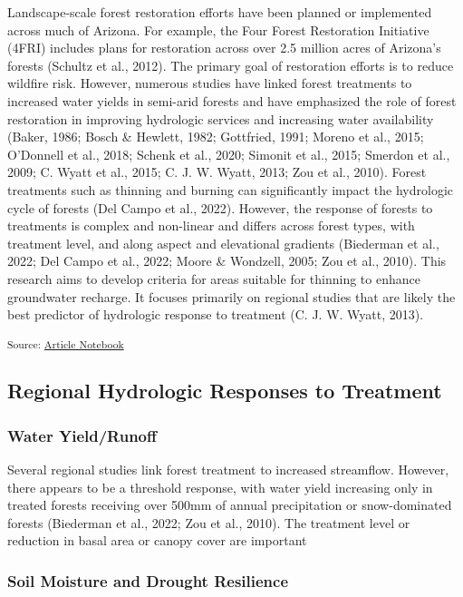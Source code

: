 \documentclass[
]{agujournal2019}
\begin{document}
Landscape-scale forest restoration efforts have been planned or
implemented across much of Arizona. For example, the Four Forest
Restoration Initiative (4FRI) includes plans for restoration across over
2.5 million acres of Arizona's forests (Schultz et al., 2012). The
primary goal of restoration efforts is to reduce wildfire risk. However,
numerous studies have linked forest treatments to increased water yields
in semi-arid forests and have emphasized the role of forest restoration
in improving hydrologic services and increasing water availability
(Baker, 1986; Bosch \& Hewlett, 1982; Gottfried, 1991; Moreno et al.,
2015; O'Donnell et al., 2018; Schenk et al., 2020; Simonit et al., 2015;
Smerdon et al., 2009; C. Wyatt et al., 2015; C. J. W. Wyatt, 2013; Zou
et al., 2010). Forest treatments such as thinning and burning can
significantly impact the hydrologic cycle of forests (Del Campo et al.,
2022). However, the response of forests to treatments is complex and
non-linear and differs across forest types, with treatment level, and
along aspect and elevational gradients (Biederman et al., 2022; Del
Campo et al., 2022; Moore \& Wondzell, 2005; Zou et al., 2010). This
research aims to develop criteria for areas suitable for thinning to
enhance groundwater recharge. It focuses primarily on regional studies
that are likely the best predictor of hydrologic response to treatment
(C. J. W. Wyatt, 2013).

\textsubscript{Source:
\href{https://Ryan3Lima.github.io/ATUR-ForestThinning/index.ipynb.html}{Article
Notebook}}

\subsection{Regional Hydrologic Responses to
Treatment}\label{regional-hydrologic-responses-to-treatment}

\subsubsection{Water Yield/Runoff}\label{water-yieldrunoff}

Several regional studies link forest treatment to increased streamflow.
However, there appears to be a threshold response, with water yield
increasing only in treated forests receiving over 500mm of annual
precipitation or snow-dominated forests (Biederman et al., 2022; Zou et
al., 2010). The treatment level or reduction in basal area or canopy
cover are important

\subsubsection{Soil Moisture and Drought
Resilience}\label{soil-moisture-and-drought-resilience}
\end{document}
